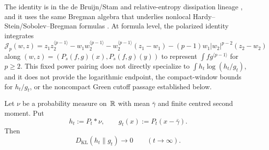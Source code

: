 The identity is in the de Bruijn/Stam and relative-entropy dissipation
lineage
\cite{DeBruijn1953,Stam1959,Blachman1965,Barron1986,
JohnsonBarron2004,MadimanBarron2007,Verdu2010Mismatched,
HirataNemotoYoshida2012IntegralRepresentation,
Yoshida2017RelativeEntropyDiffusion},
and it uses the same Bregman algebra that underlies nonlocal
Hardy--Stein/Sobolev--Bregman formulas
\cite{Bregman1967,BanuelosBogdanLuks2016HardyStein,
BanuelosKim2019HardySteinNonsymmetric,
BogdanGrzywnyPietruskaPalubaRutkowski2023NonlinearNonlocalDouglas,
Gutowski2023HardySteinPureJump,GutowskiKwasnicki2025BeurlingDenySobolevBregman,
BogdanGutowskiPietruskaPaluba2025PolarizedHardyStein}.  At formula level, the
polarized identity integrates
\[
\mathcal J_p(w,z)=z_1z_2^{\langle p-1\rangle}
-w_1w_2^{\langle p-1\rangle}-w_2^{\langle p-1\rangle}(z_1-w_1)
-(p-1)w_1|w_2|^{p-2}(z_2-w_2)
\]
along \((w,z)=(P_s(f,g)(x),P_s(f,g)(y))\) to represent
\(\int fg^{\langle p-1\rangle}\) for \(p\ge2\).  This fixed power pairing
does not directly specialize to \(\int h_t\log(h_t/g_t)\), and it does not
provide the logarithmic endpoint, the compact-window bounds for \(h_t/g_t\),
or the noncompact Green cutoff passage established below.

\begin{lemma}%
\label{lem:poisson-second-moment-kl-decay}
Let $\nu$ be a probability measure on~$\mathbb{R}$ with mean $\bar{\gamma}$ and
finite centred second moment.  Put
\[
h_t:=P_t*\nu,
\qquad
g_t(x):=P_t(x-\bar{\gamma}).
\]
Then
\[
D_{\mathrm{KL}}(h_t\|g_t)\longrightarrow0
\qquad(t\to\infty).
\]
\end{lemma}

